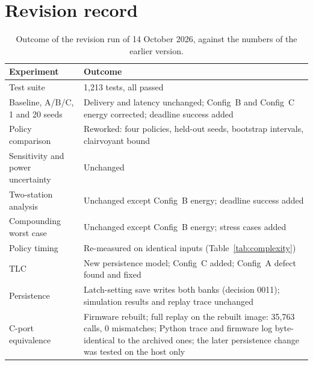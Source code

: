 \documentclass[preprint,12pt]{elsarticle}
\newcommand{\cfgA}{Config~A}
\newcommand{\cfgB}{Config~B}
\newcommand{\cfgC}{Config~C}
\newcommand{\TestCount}{1,213}
\newcommand{\ReplayOutcome}{Firmware rebuilt; full replay on the rebuilt image: 35,763 calls, 0 mismatches; Python trace and firmware log byte-identical to the archived ones}
\begin{document}
\section{Revision record}\label{app:revision}

\begin{table}[t]
\centering
\footnotesize
\caption{Outcome of the revision run of 14 October 2026, against the numbers of the earlier version.}
\label{tab:rerun}
\begin{tabular}{@{}p{}p{}@{}}
\toprule
Experiment & Outcome \\
\midrule
Test suite & \TestCount{} tests, all passed \\
Baseline, A/B/C, 1 and 20 seeds & Delivery and latency unchanged; \cfgB{} and \cfgC{} energy corrected; deadline success added \\
Policy comparison & Reworked: four policies, held-out seeds, bootstrap intervals, clairvoyant bound \\
Sensitivity and power uncertainty & Unchanged \\
Two-station analysis & Unchanged except \cfgB{} energy; deadline success added \\
Compounding worst case & Unchanged except \cfgB{} energy; stress cases added \\
Policy timing & Re-measured on identical inputs (Table~\ref{tab:complexity}) \\
TLC & New persistence model; \cfgC{} added; \cfgA{} defect found and fixed \\
Persistence & Latch-setting save writes both banks (decision 0011); simulation results and replay trace unchanged \\
C-port equivalence & \ReplayOutcome; the later persistence change was tested on the host only \\
\bottomrule
\end{tabular}
\end{table}
\end{document}
